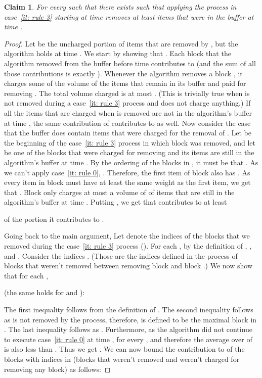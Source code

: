 \documentclass[11pt]{article}
\newtheorem{claim}[theorem]{Claim}
\begin{document}
\begin{claim}\label{cl: rule3_a}
For every  such that 
there exists  such that
applying the process in case~\ref{it: rule 3} starting at time 
removes at least  items that were in the buffer at time .
\end{claim}

\begin{proof}
Let  be
the uncharged portion of items that are removed by , but the algorithm holds
at time . We start by showing that .
Each block  that the algorithm removed from the buffer
before time  contributes  to 
(and the sum of all those contributions is exactly ).
Whenever the algorithm removes a block ,
it charges some of the volume of
the items that remain in its buffer and paid for removing .
The total volume charged is at most .
(This is trivially true when  is not removed during a
case~\ref{it: rule 3} process and does not charge anything.)
If all the items that are charged when  is removed
are not in the algorithm's buffer at time ,
the same contribution of  contributes
to  as well. Now consider the case that the
buffer does contain items that were charged
for the removal of . Let  be the beginning
of the case~\ref{it: rule 3} process in which
block  was removed,
and let  be one of the blocks that
were charged for removing  and its items
are still in the algorithm's buffer at time .
By the ordering of the blocks in , it must
be that . As we can't apply
case~\ref{it: rule 0}, .
Therefore, the first item  of block  also has
.
As every item in block  must have at least the same weight
as the first item,
we get that . Block  only charges at most a
volume of  of items that are still in
the algorithm's buffer at time .
Putting , we get that 
contributes to  at least

of the portion it contributes to .

Going back to the main argument,
Let  denote the indices of the blocks
that we removed during the case~\ref{it: rule 3} process
().
For each , by the definition of ,
,
and .
Consider the indices . (Those
are the indices defined in the process of blocks that weren't removed
between removing block  and block .)
We now show that for each ,
 
(the same holds for  and ):

The first inequality follows from the definition of .
The second inequality follows as  is not removed by
the process, therefore,  is defined to be the
maximal block in .
The last inequality follows as
.
Furthermore, as the algorithm did not continue to execute case~\ref{it: rule 0}
at time ,
 for every ,
and therefore the average over  of  is also
less than .
Thus we get .
We can now bound the contribution to  of the blocks
with indices in 
(blocks that weren't removed and weren't
charged for removing any block) as follows:


\end{proof}
\end{document}
